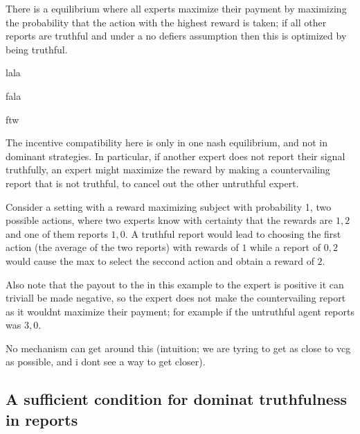 There is a  equilibrium where all experts maximize their payment by maximizing the probability that the action with the highest reward is taken; if all other reports are truthful and under a no defiers assumption then this is optimized by being truthful.


\begin{defn}
	lala
\end{defn}

\begin{defn}
	fala
\end{defn}

\begin{defn}
	ftw
\end{defn}

The incentive compatibility here is only in one nash equilibrium, and not in dominant strategies. In particular, if another expert does not report their signal truthfully, an expert might maximize the reward by making a countervailing report that is not truthful, to cancel out the other untruthful expert. 

\begin{eg}
	Consider a setting with a reward maximizing subject with probability 1, two possible actions, where two experts know with certainty that the rewards are $1,2$ and one of them reports $1,0$. A truthful report would lead to choosing the first action (the average of the two reports) with rewards of $1$ while a report of $0,2$ would cause the max to select the seccond action and obtain a reward of $2$.
\end{eg}

Also note that the payout to the in this example to the expert is positive it can triviall be made negative, so the expert does not make the countervailing report as it wouldnt maximize their payment; for example if the untruthful agent reports was $3,0$.

\begin{con}
	No mechanism can get around this (intuition; we are tyring to get as close to vcg as possible, and i dont see a way to get closer).
\end{con}

\subsection{A sufficient condition for dominat truthfulness in reports}

